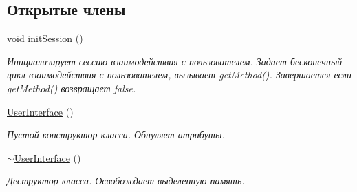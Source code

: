 \subsection*{Открытые члены}
\begin{DoxyCompactItemize}
\item 
void \hyperlink{class_user_interface_a6c7f9ef9faa40eaf4760d57e89228786}{init\+Session} ()
\begin{DoxyCompactList}\small\item\em Инициализирует сессию взаимодействия с пользователем. Задает бесконечный цикл взаимодействия с пользователем, вызывает get\+Method(). Завершается если get\+Method() возвращает false. \end{DoxyCompactList}\item 
\hyperlink{class_user_interface_ae6fb70370701b3bd6120e923df9705b0}{User\+Interface} ()
\begin{DoxyCompactList}\small\item\em Пустой конструктор класса. Обнуляет атрибуты. \end{DoxyCompactList}\item 
\hyperlink{class_user_interface_ae588b2ff1711a016dd4c6fc5002c0841}{$\sim$\+User\+Interface} ()
\begin{DoxyCompactList}\small\item\em Деструктор класса. Освобождает выделенную память. \end{DoxyCompactList}\end{DoxyCompactItemize}
